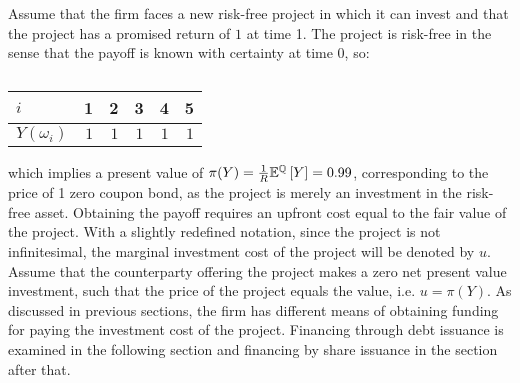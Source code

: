 \documentclass[main.tex]{subfiles}
\begin{document}
    Assume that the firm faces a new risk-free project in which it can invest
    and that the project has a promised return of $\num{1}$ at time 1.
    The project is risk-free in the sense that the payoff is known with certainty at time 0, so:
        \begin{table}[H]
            \centering
            \begin{tabular}{l|rrrrr}
                $i$ & 1 & 2 & 3 & 4 & 5 \\
                \hline
                $Y(\omega_{i})$ & $\num{1}$ & $\num{1}$ & $\num{1}$ & $\num{1}$ & $\num{1}$
            \end{tabular}
            \caption{}
            \label{tbl:single-period-simple-derivative-payoff}
        \end{table}
    which implies a present value of 
    $\pi(Y) = \frac{1}{R} \mathbb{E}^{\mathbb{Q}}\left[Y\right] = \num{0.99}$, 
    corresponding to the price of 1 zero coupon bond, 
    as the project is merely an investment in the risk-free asset.
    Obtaining the payoff requires an upfront cost equal to the fair value of the project.
    With a slightly redefined notation, since the project is not infinitesimal,
    the marginal investment cost of the project will be denoted by $u$.
    Assume that the counterparty offering the project makes a zero net present value investment, 
    such that the price of the project equals the value, i.e. $u = \pi(Y)$.
    As discussed in previous sections, the firm has different means of obtaining funding
    for paying the investment cost of the project.
    Financing through debt issuance is examined in the following section 
    and financing by share issuance in the section after that.
\end{document}
